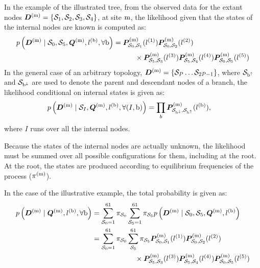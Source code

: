 In the example of the illustrated tree, from the observed data for the extant nodes $\bm{D}^{(\text{m})} = \{ \mathcal{S}_1,\mathcal{S}_2, \mathcal{S}_3, \mathcal{S}_4 \}$, at site $\text{m}$, the \gls{likelihood} given that the states of the internal nodes are known is computed as:
\begin{align}
    p\left(\bm{D}^{(\text{m})} \mid \mathcal{S}_0, \mathcal{S}_5, \bm{Q}^{(\text{m})}, l^{(\text{b})}, \forall \text{b} \right) & = \bm{P}^{(\text{m})}_{\mathcal{S}_0, \mathcal{S}_1}(l^{(1)})
    \bm{P}^{(\text{m})}_{\mathcal{S}_0, \mathcal{S}_2}(l^{(2)}) \\
    & \quad \quad \quad
    \times \bm{P}^{(\text{m})}_{\mathcal{S}_5, \mathcal{S}_3}(l^{(3)})
    \bm{P}^{(\text{m})}_{\mathcal{S}_5, \mathcal{S}_4}(l^{(4)})
    \bm{P}^{(\text{m})}_{\mathcal{S}_0, \mathcal{S}_5}(l^{(5)}) \notag
\end{align}
In the general case of an arbitrary topology, $\bm{D}^{(\text{m})} = \{ \mathcal{S}_P \hdots \mathcal{S}_{2P-1} \}$, where $\mathcal{S}_{\text{b}^{\uparrow}}$ and $\mathcal{S}_{\text{b}^{\downarrow}}$ are used to denote the parent and descendant nodes of a branch, the \gls{likelihood} conditional on internal states is given as:
\begin{align}
    p\left(\bm{D}^{(\text{m})} \mid \mathcal{S}_{I}, \bm{Q}^{(\text{m})}, l^{(\text{b})}, \forall (I, \text{b}) \right) & = \prod_{b} \bm{P}^{(\text{m})}_{\mathcal{S}_{\text{b}^{\downarrow}}, \mathcal{S}_{\text{b}^{\uparrow}}}(l^{(\text{b})}),
\end{align}
where $I$ runs over all the internal nodes.

Because the states of the internal nodes are actually unknown, the \gls{likelihood} must be summed over all possible configurations for them, including at the root.
At the root, the states are produced according to equilibrium frequencies of the process ($\pi^{(\text{m})}$).

In the case of the illustrative example, the total probability is given as:
\begin{align}
    p\left(\bm{D}^{(\text{m})} \mid \bm{Q}^{(\text{m})}, l^{(\text{b})} , \forall \text{b} \right) & = \sum\limits_{\mathcal{S}_0=1}^{61} \pi_{\mathcal{S}_0} \sum\limits_{\mathcal{S}_5=1}^{61} \pi_{\mathcal{S}_5} p\left(\bm{D}^{(\text{m})} \mid \mathcal{S}_0, \mathcal{S}_5, \bm{Q}^{(\text{m})}, l^{(\text{b})} \right) \\
    & = \sum\limits_{\mathcal{S}_0=1}^{61} \pi_{\mathcal{S}_0} \sum\limits_{\mathcal{S}_5}^{61} \pi_{\mathcal{S}_5} \bm{P}^{(\text{m})}_{\mathcal{S}_0, \mathcal{S}_1}(l^{(1)})
    \bm{P}^{(\text{m})}_{\mathcal{S}_0, \mathcal{S}_2}(l^{(2)}) \\
    & \qquad \qquad \qquad
    \times \bm{P}^{(\text{m})}_{\mathcal{S}_5, \mathcal{S}_3}(l^{(3)})
    \bm{P}^{(\text{m})}_{\mathcal{S}_5, \mathcal{S}_4}(l^{(4)})
    \bm{P}^{(\text{m})}_{\mathcal{S}_0, \mathcal{S}_5}(l^{(5)})\notag
\end{align}


